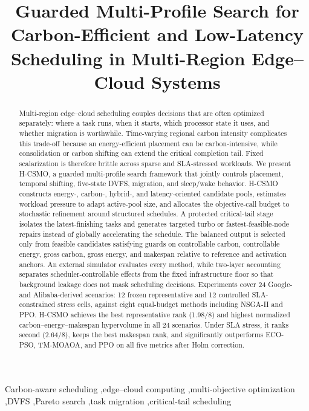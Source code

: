 \documentclass[preprint,12pt]{elsarticle}
\begin{document}
\begin{frontmatter}

\title{Guarded Multi-Profile Search for Carbon-Efficient and Low-Latency Scheduling in Multi-Region Edge--Cloud Systems}



\begin{abstract}
Multi-region edge--cloud scheduling couples decisions that are often optimized separately: where a task runs, when it starts, which processor state it uses, and whether migration is worthwhile. Time-varying regional carbon intensity complicates this trade-off because an energy-efficient placement can be carbon-intensive, while consolidation or carbon shifting can extend the critical completion tail. Fixed scalarization is therefore brittle across sparse and SLA-stressed workloads. We present H-CSMO, a guarded multi-profile search framework that jointly controls placement, temporal shifting, five-state DVFS, migration, and sleep/wake behavior. H-CSMO constructs energy-, carbon-, hybrid-, and latency-oriented candidate pools, estimates workload pressure to adapt active-pool size, and allocates the objective-call budget to stochastic refinement around structured schedules. A protected critical-tail stage isolates the latest-finishing tasks and generates targeted turbo or fastest-feasible-node repairs instead of globally accelerating the schedule. The balanced output is selected only from feasible candidates satisfying guards on controllable carbon, controllable energy, gross carbon, gross energy, and makespan relative to reference and activation anchors. An external simulator evaluates every method, while two-layer accounting separates scheduler-controllable effects from the fixed infrastructure floor so that background leakage does not mask scheduling decisions. Experiments cover 24 Google- and Alibaba-derived scenarios: 12 frozen representative and 12 controlled SLA-constrained stress cells, against eight equal-budget methods including NSGA-II and PPO. H-CSMO achieves the best representative rank (1.98/8) and highest normalized carbon--energy--makespan hypervolume in all 24 scenarios. Under SLA stress, it ranks second (2.64/8), keeps the best makespan rank, and significantly outperforms ECO-PSO, TM-MOAOA, and PPO on all five metrics after Holm correction.
\end{abstract}

\begin{keyword}
Carbon-aware scheduling \sep edge--cloud computing \sep multi-objective optimization \sep DVFS \sep Pareto search \sep task migration \sep critical-tail scheduling
\end{keyword}

\end{frontmatter}
\end{document}

